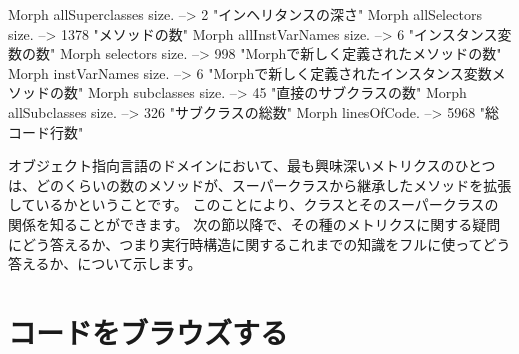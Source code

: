 \documentclass[a4paper,10pt,twoside]{book}
\begin{document}
\begin{code}{}
Morph allSuperclasses size.  -->       2 "インヘリタンスの深さ"
Morph allSelectors size.        --> 1378 "メソッドの数"
Morph allInstVarNames size. -->      6 "インスタンス変数の数"
Morph selectors size.             -->  998 "Morphで新しく定義されたメソッドの数"
Morph instVarNames size.     -->      6 "Morphで新しく定義されたインスタンス変数メソッドの数"
Morph subclasses size.          -->    45 "直接のサブクラスの数"
Morph allSubclasses size.      -->  326 "サブクラスの総数"
Morph linesOfCode.               --> 5968 "総コード行数"
\end{code}

オブジェクト指向言語のドメインにおいて、最も興味深いメトリクスのひとつは、どのくらいの数のメソッドが、スーパークラスから継承したメソッドを拡張しているかということです。
このことにより、クラスとそのスーパークラスの関係を知ることができます。
次の節以降で、その種のメトリクスに関する疑問にどう答えるか、つまり実行時構造に関するこれまでの知識をフルに使ってどう答えるか、について示します。%

\section{コードをブラウズする}
\end{document}
